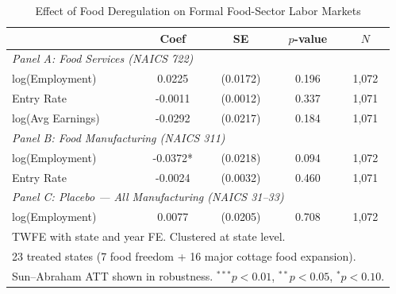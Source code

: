 \begin{table}[t]
\centering
\caption{Effect of Food Deregulation on Formal Food-Sector Labor Markets}
\label{tab:main}
\begin{tabular}{lcccc}
\toprule
 & Coef & SE & $p$-value & $N$ \\
\midrule
\multicolumn{5}{l}{\textit{Panel A: Food Services (NAICS 722)}} \\
log(Employment) & 0.0225 & (0.0172) & 0.196 & 1,072 \\
Entry Rate & -0.0011 & (0.0012) & 0.337 & 1,071 \\
log(Avg Earnings) & -0.0292 & (0.0217) & 0.184 & 1,071 \\
\midrule
\multicolumn{5}{l}{\textit{Panel B: Food Manufacturing (NAICS 311)}} \\
log(Employment) & -0.0372* & (0.0218) & 0.094 & 1,072 \\
Entry Rate & -0.0024 & (0.0032) & 0.460 & 1,071 \\
\midrule
\multicolumn{5}{l}{\textit{Panel C: Placebo --- All Manufacturing (NAICS 31--33)}} \\
log(Employment) & 0.0077 & (0.0205) & 0.708 & 1,072 \\
\midrule
\multicolumn{5}{l}{\footnotesize TWFE with state and year FE. Clustered at state level.} \\
\multicolumn{5}{l}{\footnotesize 23 treated states (7 food freedom + 16 major cottage food expansion).} \\
\multicolumn{5}{l}{\footnotesize Sun--Abraham ATT shown in robustness. $^{***}p<0.01$, $^{**}p<0.05$, $^{*}p<0.10$.} \\
\bottomrule
\end{tabular}
\end{table}


